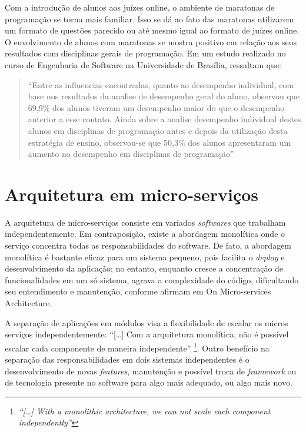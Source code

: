 Com a introdução de alunos aos juízes online, o ambiente de maratonas de programação se torna mais familiar. Isso se dá ao fato das maratonas utilizarem um formato de questões parecido ou até mesmo igual ao formato de juízes online. O envolvimento de alunos com maratonas se mostra positivo em relação aos seus resultados com disciplinas gerais de programação. Em um estudo realizado no curso de Engenharia de Software na Universidade de Brasília,  ressaltam que:

\begin{quote}
    ``Entre as influencias encontradas, quanto ao desempenho individual, com base nos resultados da analise de desempenho geral do aluno, observou que 69,9\% dos alunos tiveram um desempenho maior do que o desempenho anterior a esse contato. Ainda sobre a analise desempenho individual destes alunos em disciplinas de programação antes e depois da utilização desta estratégia de ensino, observou-se que 50,3\% dos alunos apresentaram um aumento no desempenho em disciplinas de programação'' \cite[p.218]{pereiraetal}
\end{quote} 

\section{Arquitetura em micro-serviços}
\label{sec:microServicos}

A arquitetura de micro-serviços consiste em variados \textit{softwares} que trabalham independentemente. Em contraposição, existe a abordagem monolítica onde o serviço concentra todas as responsabilidades do software. De fato, a abordagem monolítica é bastante eficaz para um sistema pequeno, pois facilita o \textit{deploy} e desenvolvimento da aplicação; no entanto, enquanto cresce a concentração de funcionalidades em um só sistema, agrava a complexidade do código, dificultando seu entendimento e manutenção, conforme afirmam  em On Micro-services Architecture.

A separação de aplicações em módulos visa a flexibilidade de escalar os micros serviços independentemente: ``[\dots] Com a arquitetura monolítica, não é possível escalar cada componente de maneira independente'' \cite[p.24, tradução nossa]{dmitry2014micro}\footnote{\textit{``[\dots] With a monolithic architecture, we can not scale each component independently''}}. Outro benefício na separação das responsabilidades em dois sistemas independentes é o desenvolvimento de novas \textit{features}, manutenção e possível troca de \textit{framework} ou de tecnologia presente no software para algo mais adequado, ou algo mais novo. 

